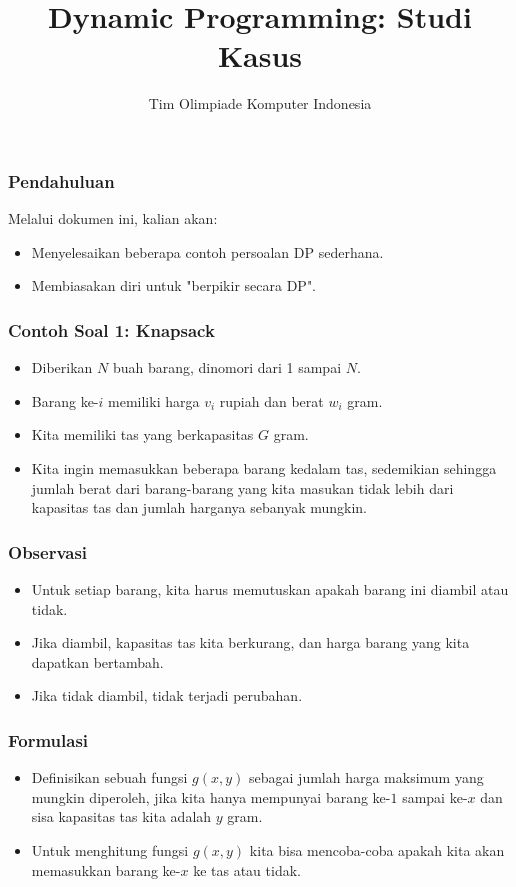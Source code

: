 

\title{Dynamic Programming: \newline Studi Kasus}
\author{Tim Olimpiade Komputer Indonesia}
\date{}

\usepackage{qtree}


\begin{frame}
\titlepage
\end{frame}

\begin{frame}
\frametitle{Pendahuluan}
Melalui dokumen ini, kalian akan:
\begin{itemize}
  \item Menyelesaikan beberapa contoh persoalan DP sederhana.
  \item Membiasakan diri untuk "berpikir secara DP".
\end{itemize}
\end{frame}

\begin{frame} 
\frametitle{Contoh Soal 1: Knapsack}
\begin{itemize}
  \item Diberikan $N$ buah barang, dinomori dari 1 sampai $N$. 
  \item Barang ke-$i$ memiliki harga $v_i$ rupiah dan berat $w_i$ gram. 
  \item Kita memiliki tas yang berkapasitas $G$ gram. 
  \item Kita ingin memasukkan beberapa barang kedalam tas, sedemikian sehingga jumlah berat dari barang-barang yang kita masukan tidak lebih dari kapasitas tas dan jumlah harganya sebanyak mungkin.
\end{itemize}
\end{frame}

\begin{frame} 
\frametitle{Observasi}
\begin{itemize}
  \item Untuk setiap barang, kita harus memutuskan apakah barang ini diambil atau tidak.
  \item Jika diambil, kapasitas tas kita berkurang, dan harga barang yang kita dapatkan bertambah.
  \item Jika tidak diambil, tidak terjadi perubahan.
\end{itemize}
\end{frame}

\begin{frame} 
\frametitle{Formulasi}
\begin{itemize}
  \item Definisikan sebuah fungsi $g(x,y)$ sebagai jumlah harga maksimum yang mungkin diperoleh, jika kita hanya mempunyai barang ke-$1$ sampai ke-$x$ dan sisa kapasitas tas kita adalah $y$ gram.
  \item Untuk menghitung fungsi $g(x,y)$ kita bisa mencoba-coba apakah kita akan memasukkan barang ke-$x$ ke tas atau tidak.
\end{itemize}
\end{frame}


